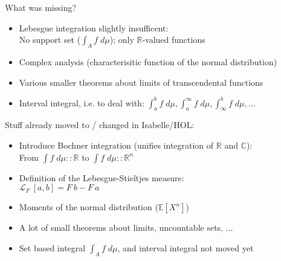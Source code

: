 \documentclass[usepdftitle=false]{beamer}
\begin{document}
\begin{frame}

What was missing?

\begin{itemize}
\item Lebesgue integration slightly insufficent: \\
  No support set ($\int_A f\;d\mu$); only $\mathbb{R}$-valued functions
\pause
\item Complex analysis (characterisitic function of the normal distribution)
\pause

\item Various smaller theorems about limits of transcendental functions
\pause

\item Interval integral, i.e. to deal with: $\int_{a}^b f\; d\mu, \int_{a}^\infty f\; d\mu, \int_{\infty}^b f\; d\mu, \ldots$

\end{itemize}

\pause

Stuff already moved to / changed in Isabelle/HOL:

\begin{itemize}

\item Introduce Bochner integration (unifies integration of $\mathbb{R}$ and $\mathbb{C}$): \\
  From $\int {f}\; d\!\mu :: \mathbb{R}$ to $\int {f}\; d\!\mu :: \mathbb{R}^n$

\pause

\item Definition of the Lebesgue-Stieltjes measure: \\ 
  $\mathcal{L}_F~[a, b] = F~b - F~a$

\pause

\item Moments of the normal distribution ($\mathbb{E}[X^n]$)

\pause

\item A lot of small theorems about limits, uncountable sets, $\dots$

\pause

\item Set based integral $\int_A f\;d\mu$, and interval integral not moved yet

\end{itemize}

\end{frame}
\end{document}
